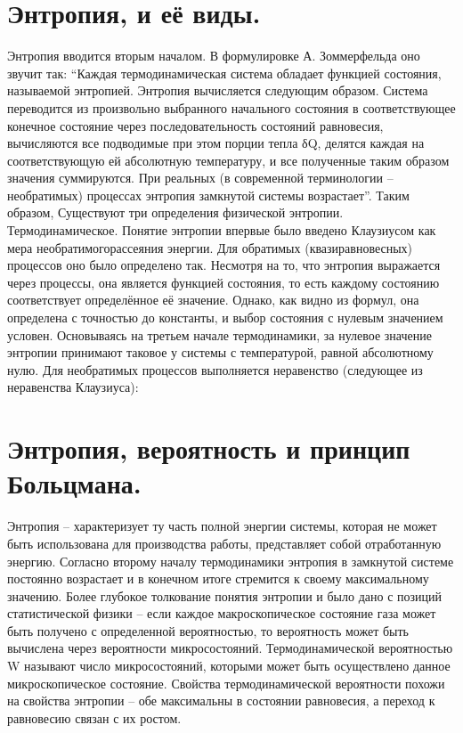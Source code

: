 \documentclass[bachelor, och, referat ]{SCWorks}
\begin{document}
\newpage

\section{Энтропия, и её виды.}
Энтропия вводится вторым началом. В формулировке А. Зоммерфельда оно звучит так: “Каждая термодинамическая система обладает функцией состояния, называемой энтропией. Энтропия вычисляется следующим образом. Система переводится из произвольно выбранного начального состояния в соответствующее конечное состояние через последовательность состояний равновесия, вычисляются все подводимые при этом порции тепла δQ, делятся каждая на соответствующую ей абсолютную температуру, и все полученные таким образом значения суммируются. При реальных (в современной терминологии – необратимых) процессах энтропия замкнутой системы возрастает”. Таким образом,
Существуют три определения физической энтропии.
Термодинамическое.
 Понятие энтропии впервые было введено Клаузиусом как мера необратимогорассеяния энергии. Для обратимых (квазиравновесных) процессов оно было определено так.
 Несмотря на то, что энтропия выражается через процессы, она является функцией состояния, то есть каждому состоянию соответствует определённое её значение. Однако, как видно из формул, она определена с точностью до константы, и выбор состояния с нулевым значением условен. Основываясь на третьем начале термодинамики, за нулевое значение энтропии принимают таковое у системы с
температурой, равной абсолютному нулю. Для необратимых процессов выполняется неравенство (следующее из неравенства Клаузиуса): 


\newpage

\section{Энтропия, вероятность и принцип Больцмана.}
Энтропия – характеризует ту часть полной энергии системы, которая не может быть использована для производства работы, представляет собой отработанную энергию.
Согласно второму началу термодинамики энтропия в замкнутой системе постоянно возрастает и в конечном итоге стремится к своему максимальному значению.
Более глубокое толкование понятия энтропии и было дано с позиций статистической физики – если каждое макроскопическое состояние газа может быть получено с определенной вероятностью, то вероятность может быть вычислена через вероятности микросостояний.
Термодинамической вероятностью W называют число микросостояний, которыми может быть осуществлено данное микроскопическое состояние. Свойства термодинамической вероятности похожи на свойства энтропии – обе максимальны в состоянии равновесия, а переход к равновесию связан с их ростом.
\end{document}
